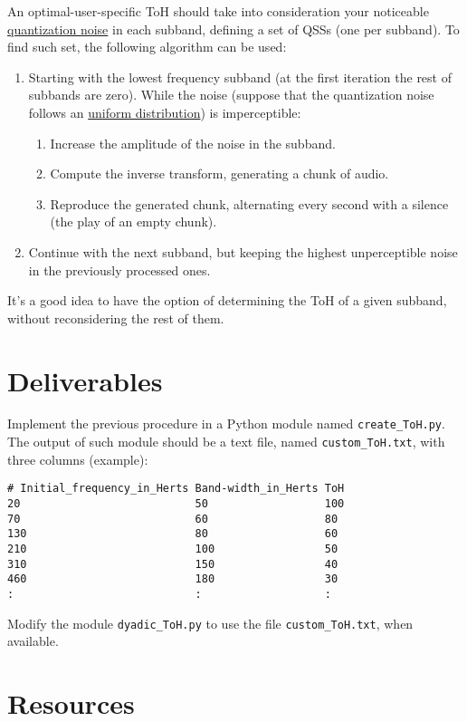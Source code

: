 An optimal-user-specific ToH
should take into consideration your noticeable
\href{https://en.wikipedia.org/wiki/Quantization_(signal_processing)}{quantization
  noise} in each subband, defining a set of QSSs (one per subband). To
find such set, the following algorithm can be used:

\begin{enumerate}
\item %
  Starting with the lowest frequency subband (at the first
  iteration the rest of subbands are zero). While the noise
  (suppose that the quantization noise follows an
  \href{https://en.wikipedia.org/wiki/Continuous_uniform_distribution}{uniform
    distribution}) is imperceptible:
  \begin{enumerate}
  \item Increase the amplitude of the noise in the subband.
  \item Compute the inverse transform, generating a chunk of audio.
  \item Reproduce the generated chunk, alternating every second with
    a silence (the play of an empty chunk).
  \end{enumerate}
\item Continue with the next subband, but keeping the
  highest unperceptible noise in the previously processed
  ones.
\end{enumerate}

It's a good idea to have the option of determining the ToH of a given
subband, without reconsidering the rest of them.

\section{Deliverables}

Implement the previous procedure in a Python module named
\verb|create_ToH.py|. The output of such module should be a text file,
named \verb|custom_ToH.txt|, with three columns (example):
\begin{verbatim}
# Initial_frequency_in_Herts Band-width_in_Herts ToH
20                           50                  100
70                           60                  80
130                          80                  60
210                          100                 50
310                          150                 40
460                          180                 30
:                            :                   :
\end{verbatim}

Modify the module \verb|dyadic_ToH.py| to use the file
\verb|custom_ToH.txt|, when available.

\section{Resources}



